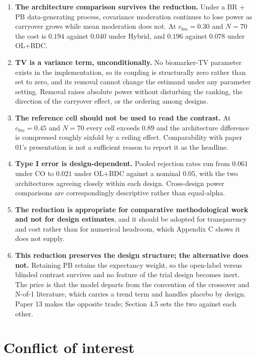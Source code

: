 \documentclass[
  11pt,
]{article}
\begin{document}
\begin{enumerate}
\def\labelenumi{\arabic{enumi}.}
\item
  \textbf{The architecture comparison survives the reduction.} Under
  a BR + PB data-generating process, covariance moderation continues
  to lose power as carryover grows while mean moderation does not.
  At \(c_{bm} = 0.30\) and \(N = 70\) the cost is \(0.194\) against
  \(0.040\) under Hybrid, and \(0.196\) against \(0.078\) under OL+BDC.
\item
  \textbf{TV is a variance term, unconditionally.} No biomarker-TV
  parameter exists in the implementation, so its coupling is
  structurally zero rather than set to zero, and its removal cannot
  change the estimand under any parameter setting. Removal raises
  absolute power without disturbing the ranking, the direction of
  the carryover effect, or the ordering among designs.
\item
  \textbf{The reference cell should not be used to read the
  contrast.} At \(c_{bm} = 0.45\) and \(N = 70\) every cell exceeds
  \(0.89\) and the architecture difference is compressed roughly
  sixfold by a ceiling effect. Comparability with paper 01's
  presentation is not a sufficient reason to report it as the
  headline.
\item
  \textbf{Type I error is design-dependent.} Pooled rejection rates
  run from \(0.061\) under CO to \(0.021\) under OL+BDC against a
  nominal \(0.05\), with the two architectures agreeing closely within
  each design. Cross-design power comparisons are correspondingly
  descriptive rather than equal-alpha.
\item
  \textbf{The reduction is appropriate for comparative
  methodological work and not for design estimates}, and it should
  be adopted for transparency and cost rather than for numerical
  headroom, which Appendix C shows it does not supply.
\item
  \textbf{This reduction preserves the design structure; the
  alternative does not.} Retaining PB retains the expectancy weight,
  so the open-label versus blinded contrast survives and no feature
  of the trial design becomes inert. The price is that the model
  departs from the convention of the crossover and N-of-1
  literature, which carries a trend term and handles placebo by
  design. Paper 13 makes the opposite trade; Section 4.5 sets the
  two against each other.
\end{enumerate}

\section{Conflict of interest}
\end{document}
